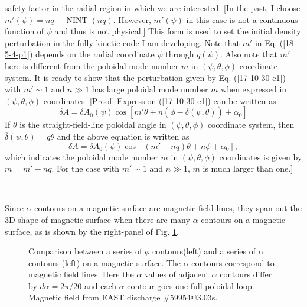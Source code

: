 \documentclass{llncs}
\newcommand{\tmop}[1]{\ensuremath{\operatorname{#1}}}
\begin{document}
safety factor in the radial region in which we are interested. [In the past, I
choose $m' (\psi) = n q - \tmop{NINT} (n q)$. However, $m' (\psi)$ in this
case is not a continuous function of $\psi$ and thus is not physical.] This
form is used to set the initial density perturbation in the fully kinetic code
I am developing. Note that $m'$ in Eq. (\ref{18-5-4-p1}) depends on the radial
coordinate $\psi$ through $q (\psi)$. Also note that $m'$ here is different
from the poloidal mode number $m$ in $(\psi, \theta, \phi)$ coordinate system.
It is ready to show that the perturbation given by Eq. (\ref{17-10-30-e1})
with $m' \sim 1$ and $n \gg 1$ has large poloidal mode number $m$ when
expressed in $(\psi, \theta, \phi)$ coordinates. [Proof: Expression
(\ref{17-10-30-e1}) can be written as
\begin{equation}
  \delta A = \delta A_0 (\psi) \cos [m' \theta + n (\phi - \overline{\delta}
  (\psi, \theta)) + \alpha_0]
\end{equation}
If $\theta$ is the straight-field-line poloidal angle in $(\psi, \theta,
\phi)$ coordinate system, then $\overline{\delta} (\psi, \theta) = q \theta$
and the above equation is written as
\begin{equation}
  \delta A = \delta A_0 (\psi) \cos [(m' - n q) \theta + n \phi + \alpha_0],
\end{equation}
which indicates the poloidal mode number $m$ in $(\psi, \theta, \phi)$
coordinates is given by $m = m' - n q$. For the case with $m' \sim 1$ and $n
\gg 1$, $m$ is much larger than one.]

\

Since $\alpha$ contours on a magnetic surface are magnetic field lines, they
span out the 3D shape of magnetic surface when there are many $\alpha$
contours on a magnetic surface, as is shown by the right-panel of Fig.
\ref{17-10-29-e1}.

\begin{figure}[h]
  \caption{\label{17-10-29-e1}Comparison between a series of $\phi$
  contours(left) and a series of $\alpha$ contours (left) on a magnetic
  surface. The $\alpha$ contours correspond to magnetic field lines. Here the
  $\alpha$ values of adjacent $\alpha$ contours differ by $d \alpha = 2 \pi /
  20$ and each $\alpha$ contour goes one full poloidal loop. Magnetic field
  from EAST discharge \#59954@3.03s.}
\end{figure}
\end{document}
